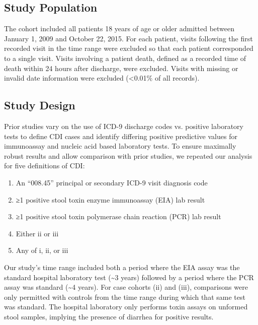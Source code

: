 \subsection{Study Population}

The cohort included all patients 18 years of age or older admitted between January 1, 2009 and October 22, 2015. For each patient, visits following the first recorded visit in the time range were excluded so that each patient corresponded to a single visit. Visits involving a patient death, defined as a recorded time of death within 24 hours after discharge, were excluded. Visits with missing or invalid date information were excluded (<0.01\% of all records). 

\subsection{Study Design}

Prior studies vary on the use of ICD-9 discharge codes vs. positive laboratory tests to define CDI cases\autocite{Gabriel2014,Zhang2016} and identify differing positive predictive values for immunoassay and nucleic acid based laboratory tests.\autocite{Bagdasarian2015,Moehring2013,Polage2015} To ensure maximally robust results and allow comparison with prior studies, we repeated our analysis for five definitions of CDI:

\begin{enumerate}[label=(\roman*),noitemsep,labelindent=2em,leftmargin=!]
\item An “008.45” principal or secondary ICD-9 visit diagnosis code
\item ≥1 positive stool toxin enzyme immunoassay (EIA) lab result
\item ≥1 positive stool toxin polymerase chain reaction (PCR) lab result
\item Either ii or iii
\item Any of i, ii, or iii
\end{enumerate}

Our study’s time range included both a period where the EIA assay was the standard hospital laboratory test (\textasciitilde{}3 years) followed by a period where the PCR assay was standard (\textasciitilde{}4 years). For case cohorts (ii) and (iii), comparisons were only permitted with controls from the time range during which that same test was standard. The hospital laboratory only performs toxin assays on unformed stool samples, implying the presence of diarrhea for positive results.

